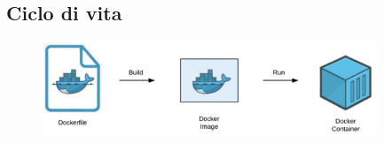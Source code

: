 \documentclass[oneside,a4paper,11pt]{book}
\theoremstyle{italicstyle}
\theoremstyle{normStyle}
\begin{document}
\subsection{Ciclo di vita }
\begin{figure}[H]
  \centering
  \includegraphics[width=10cm]{src/docker_img.png}
\end{figure}
\end{document}
